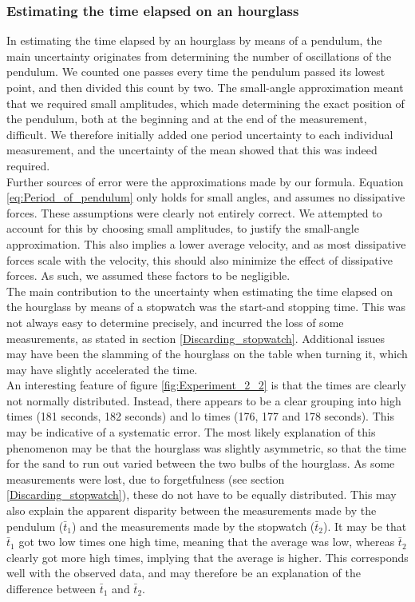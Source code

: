 \documentclass[a4paper, 10pt]{article}
\begin{document}
\subsubsection{Estimating the time elapsed on an hourglass}\label{Uncertainty_in_pendulum}
In estimating the time elapsed by an hourglass by means of a pendulum, the main uncertainty originates from determining the number of oscillations of the pendulum. We counted one passes every time the pendulum passed its lowest point, and then divided this count by two. The small-angle approximation meant that we required small amplitudes, which made determining the exact position of the pendulum, both at the beginning and at the end of the measurement, difficult. We therefore initially added one period uncertainty to each individual measurement, and the uncertainty of the mean showed that this was indeed required.\\
\linebreak
Further sources of error were the approximations made by our formula. Equation \ref{eq:Period_of_pendulum} only holds for small angles, and assumes no dissipative forces. These assumptions were clearly not entirely correct. We attempted to account for this by choosing small amplitudes, to justify the small-angle approximation. This also implies a lower average velocity, and as most dissipative forces scale with the velocity, this should also minimize the effect of dissipative forces. As such, we assumed these factors to be negligible.\\
\linebreak
The main contribution to the uncertainty when estimating the time elapsed on the hourglass by means of a stopwatch was the start-and stopping time. This was not always easy to determine precisely, and incurred the loss of some measurements, as stated in section \ref{Discarding_stopwatch}. Additional issues may have been the slamming of the hourglass on the table when turning it, which may have slightly accelerated the time.\\\linebreak
An interesting feature of figure \ref{fig:Experiment_2_2} is that the times are clearly not normally distributed. Instead, there appears to be a clear grouping into high times (181 seconds, 182 seconds) and lo times (176, 177 and 178 seconds). This may be indicative of a systematic error. The most likely explanation of this phenomenon may be that the hourglass was slightly asymmetric, so that the time for the sand to run out varied between the two bulbs of the hourglass. As some measurements were lost, due to forgetfulness (see section \ref{Discarding_stopwatch}), these do not have to be equally distributed. This may also explain the apparent disparity between the measurements made by the pendulum ($\bar{t}_1$) and the measurements made by the stopwatch ($\bar{t}_2$). It may be that $\bar{t}_1$ got two low times one high time, meaning that the average was low, whereas $\bar{t}_2$ clearly got more high times, implying that the average is higher. This corresponds well with the observed data, and may therefore be an explanation of the difference between $\bar{t}_1$ and $\bar{t}_2$.
\end{document}
